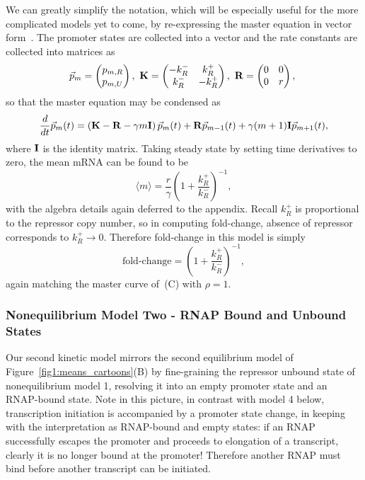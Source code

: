 We can greatly simplify the notation, which will be especially useful for the
more complicated models yet to come, by re-expressing the master equation in
vector form~\cite{Phillips2012}. The promoter states are collected into a vector and the rate
constants are collected into matrices as
\begin{equation}
\vec{p}_m = \begin{pmatrix} p_{m,R} \\ p_{m,U} \end{pmatrix},\
\mathbf{K} = \begin{pmatrix} -k_R^- & k_R^+ \\ k_R^- & -k_R^+ \end{pmatrix},\
\mathbf{R} = \begin{pmatrix} 0 & 0 \\ 0 & r \end{pmatrix},\
\label{eq:2state_cme_matrices}
\end{equation}
so that the master equation may be condensed as
\begin{equation}
\frac{d {}}{d t}\vec{p}_m(t) =
\left( \mathbf{K} - \mathbf{R} - \gamma m \mathbf{I} \right) \vec{p}_m(t)
                + \mathbf{R} \vec{p}_{m-1}(t)
                + \gamma (m+1) \mathbf{I} \vec{p}_{m+1}(t),
\label{eq:2state_rep_cme}
\end{equation}
where $\mathbf{I}$ is the identity matrix. Taking steady state by setting time
derivatives to zero, the mean mRNA can be found to be
\begin{equation}
\langle m \rangle = \frac{r}{\gamma}
        \left(1 + \frac{k_R^+}{k_R^-}\right)^{-1},
\end{equation}
with the algebra details again deferred to the appendix. Recall $k_R^+$ is
proportional to the repressor copy number, so in computing fold-change, absence
of repressor corresponds to $k_R^+\rightarrow0$. Therefore fold-change in this
model is simply
\begin{equation}
\text{fold-change} = \left(1 + \frac{k_R^+}{k_R^-}\right)^{-1},
\end{equation}
again matching the master curve of~(C) with $\rho=1$.

\subsubsection{Nonequilibrium Model Two - RNAP Bound and Unbound States}
Our second kinetic model mirrors the second equilibrium model of
Figure~\ref{fig1:means_cartoons}(B) by fine-graining  the
repressor unbound state of nonequilibrium model 1, resolving it into an empty
promoter state and an RNAP-bound state. Note in this picture, in contrast with
model 4 below, transcription initiation is accompanied by a promoter state
change, in keeping with the interpretation as RNAP-bound and empty states: if an
RNAP successfully escapes the promoter and proceeds to elongation of a
transcript, clearly it is no longer bound at the promoter! Therefore another
RNAP must bind before another transcript can be initiated.

